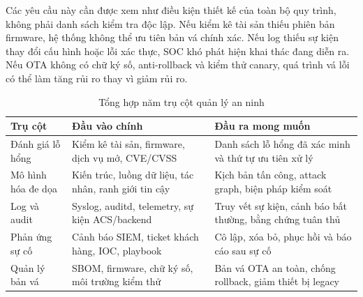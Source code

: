 \documentclass[../DoAn.tex]{subfiles}
\begin{document}
Các yêu cầu này cần được xem như điều kiện thiết kế của toàn bộ quy trình, không phải danh sách kiểm tra độc lập. Nếu kiểm kê tài sản thiếu phiên bản firmware, hệ thống không thể ưu tiên bản vá chính xác. Nếu log thiếu sự kiện thay đổi cấu hình hoặc lỗi xác thực, SOC khó phát hiện khai thác đang diễn ra. Nếu OTA không có chữ ký số, anti-rollback và kiểm thử canary, quá trình vá lỗi có thể làm tăng rủi ro thay vì giảm rủi ro.

\begin{table}[htbp]
\centering
\begin{tabular}{|p{3.1cm}|p{4.2cm}|p{5.8cm}|}
\hline
\textbf{Trụ cột} & \textbf{Đầu vào chính} & \textbf{Đầu ra mong muốn} \\ \hline
Đánh giá lỗ hổng & Kiểm kê tài sản, firmware, dịch vụ mở, CVE/CVSS & Danh sách lỗ hổng đã xác minh và thứ tự ưu tiên xử lý \\ \hline
Mô hình hóa đe dọa & Kiến trúc, luồng dữ liệu, tác nhân, ranh giới tin cậy & Kịch bản tấn công, attack graph, biện pháp kiểm soát \\ \hline
Log và audit & Syslog, auditd, telemetry, sự kiện ACS/backend & Truy vết sự kiện, cảnh báo bất thường, bằng chứng tuân thủ \\ \hline
Phản ứng sự cố & Cảnh báo SIEM, ticket khách hàng, IOC, playbook & Cô lập, xóa bỏ, phục hồi và báo cáo sau sự cố \\ \hline
Quản lý bản vá & SBOM, firmware, chữ ký số, môi trường kiểm thử & Bản vá OTA an toàn, chống rollback, giảm thiết bị legacy \\ \hline
\end{tabular}
\caption{Tổng hợp năm trụ cột quản lý an ninh}
\label{tab:five-pillars}
\end{table}
\end{document}
